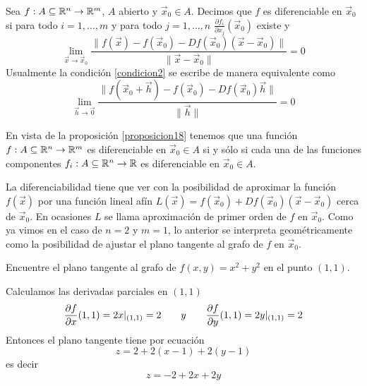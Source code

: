 \begin{definicion} Sea 
$f:A\subseteq\mathbb{R}^n\to\mathbb{R}^m$, $A$ abierto y  $\vec{x}_0\in A$. Decimos
que $f$ es diferenciable en $\vec{x}_0$ si para todo $i=1,\ldots,m $ y para todo $j=1,\ldots,n$ $\frac{\partial f_i}{\partial x_j}(\vec{x}_0)$ existe y
\begin{equation}\label{condicion2}
\lim_{\vec{x}\to \vec{x}_0}\frac{\|f(\vec{x})-f(\vec{x}_0)-Df(\vec{x}_0)(\vec{x}-\vec{x}_0)\|}{\|\vec{x}-\vec{x}_0\|}=0
\end{equation}
Usualmente la condici\'on \eqref{condicion2} se escribe de manera equivalente como
\begin{equation}\label{condicion-diferenciabilidad}
\lim_{\vec{h}\to \vec{0}}\frac{\|f(\vec{x}_0+\vec{h})-f(\vec{x}_0)-Df(\vec{x}_0)\vec{h}\|}{\|\vec{h}\|}=0 
\end{equation}
\end{definicion}
    
\begin{nota}\label{funcionescomponentes}
En vista de la proposici\'on \ref{proposicion18} tenemos que una funci\'on
$f:A\subseteq\mathbb{R}^n\to\mathbb{R}^m$ es diferenciable en $\vec{x}_0\in A$ si y s\'olo si  cada una de las
funciones componentes $f_i:A\subseteq\mathbb{R}^n\to\mathbb{R}$ es diferenciable en $\vec{x}_0\in A$.

La diferenciabilidad tiene que ver con la
posibilidad de aproximar la funci\'on $f(\vec{x})$ por una funci\'on lineal af\'in $L(\vec{x})=f(\vec{x}_0)+Df(\vec{x}_0)(\vec{x}-\vec{x}_0)$ cerca de $\vec{x}_0$. 
En ocasiones $L$ se llama  aproximaci\'on de primer 
orden de $f$ en $\vec{x}_0$.
Como ya vimos en el caso de $n=2$ y $m=1$, lo anterior se interpreta 
geom\'etricamente como la posibilidad de ajustar el plano tangente al grafo 
de $f$ en $\vec{x}_0$.
\end{nota}

\begin{ejemplo} 
Encuentre el plano tangente al grafo de $f(x,y)=x^2+y^2$ en el punto $(1,1)$.

\begin{solucion}
Calculamos las derivadas parciales en $(1,1)$
$$
\frac{\partial f}{\partial x}(1,1)=2x|_{(1,1)}=2\qquad y\qquad \frac{\partial f}{\partial y}(1,1)=2y|_{(1,1)}=2$$
Entonces el plano tangente tiene por ecuaci\'on
$$
z=2+2(x-1)+2(y-1)
$$
es decir $$
z=-2+2x+2y
$$
\end{solucion}
\end{ejemplo}

